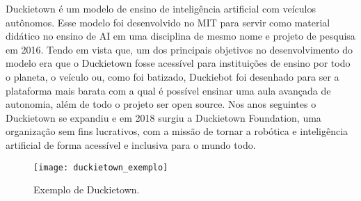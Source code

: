 

\label{cap:duckietown}

\enlargethispage{.5\baselineskip}

\label{sec:o-que-e-duckietown}

\enlargethispage{.5\baselineskip}

Duckietown é um modelo de ensino de inteligência artificial com veículos autônomos. Esse modelo foi desenvolvido no MIT para servir como material didático no ensino de AI em uma disciplina de mesmo nome e projeto de pesquisa em 2016. Tendo em vista que, um dos principais objetivos no desenvolvimento do modelo era que o Duckietown fosse acessível para instituições de ensino por todo o planeta, o veículo ou, como foi batizado, Duckiebot foi desenhado para ser a plataforma mais barata com a qual é possível ensinar uma aula avançada de autonomia, além de todo o projeto ser open source. Nos anos seguintes o Duckietown se expandiu e em 2018 surgiu a Duckietown Foundation, uma organização sem fins lucrativos, com a missão de tornar a robótica e inteligência artificial de forma acessível e inclusiva para o mundo todo. 

\begin{figure}
	\centering
	\texttt{[image: duckietown\_exemplo]}
	\caption{Exemplo de Duckietown.\label{fig:duckietown_exemplo}}
\end{figure}



